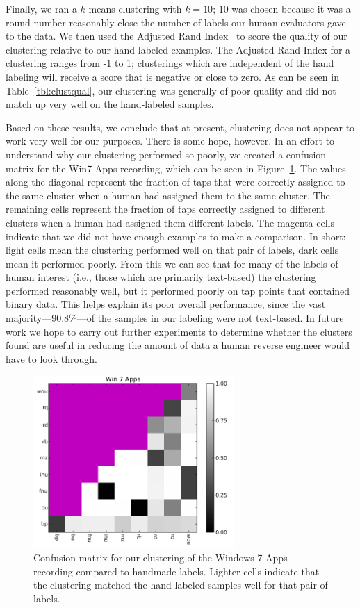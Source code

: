 Finally, we ran a $k$-means clustering with $k = 10$; $10$ was chosen
because it was a round number reasonably close the number of labels our
human evaluators gave to the data. We then used the Adjusted Rand
Index~\cite{Hubert:1985zr} to score the quality of our clustering
relative to our hand-labeled examples. The Adjusted Rand Index for a
clustering ranges from -1 to 1; clusterings which are independent of the
hand labeling will receive a score that is negative or close to zero. As
can be seen in Table~\ref{tbl:clustqual}, our clustering was generally
of poor quality and did not match up very well on the hand-labeled
samples.

Based on these results, we conclude that at present, clustering does not
appear to work very well for our purposes. There is some hope, however.
In an effort to understand why our clustering performed so poorly, we
created a confusion matrix for the Win7 Apps recording, which can be
seen in Figure~\ref{fig:win7apps}. The values along the diagonal
represent the fraction of taps that were correctly assigned to the
same cluster when a human had assigned them to the same cluster. The
remaining cells represent the fraction of taps correctly assigned to
different clusters when a human had assigned them different labels. The
magenta cells indicate that we did not have enough examples to make a
comparison. In short: light cells mean the clustering performed well on
that pair of labels, dark cells mean it performed poorly. From this we
can see that for many of the labels of human interest (i.e., those which
are primarily text-based) the clustering performed reasonably well,
but it performed poorly on tap points that contained binary data. This
helps explain its poor overall performance, since the vast
majority---90.8\%---of the samples in our labeling were not text-based.
In future work we hope to carry out further experiments to determine
whether the clusters found are useful in reducing the amount of data a
human reverse engineer would have to look through.

\begin{figure}
    \centering
    \includegraphics[width=3in]{figures/win7apps.png}
    \caption{Confusion matrix for our clustering of the Windows 7 Apps
    recording compared to handmade labels. Lighter cells indicate that
    the clustering matched the hand-labeled samples well for that
    pair of labels.}
    \label{fig:win7apps}
\end{figure}

